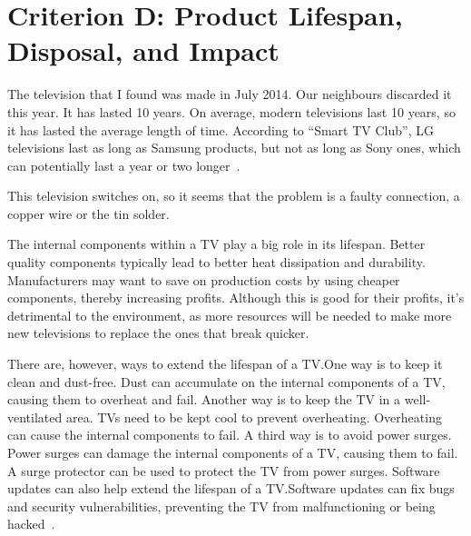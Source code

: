 \documentclass[12pt, letterpaper]{article}
\begin{document}
\section{Criterion D: Product Lifespan, Disposal, and Impact}

The television that I found was made in July 2014. Our neighbours
discarded it this year. It has lasted 10 years. On average, modern
televisions last 10 years, so it has lasted the average length of
time. According to ``Smart TV Club'', LG televisions last as long as
Samsung products, but not as long as Sony ones, which can potentially
last a year or two longer~\autocite{raj-2024}.

This television switches on, so it seems that the problem is a faulty
connection, a copper wire or the tin solder.

The internal components within a TV play a big role in its lifespan.
Better quality components typically lead to better heat dissipation
and durability. Manufacturers may want to save on production costs by
using cheaper components, thereby increasing profits. Although this
is good for their profits, it's detrimental to the environment, as
more resources will be needed to make more new televisions to replace
the ones that break quicker.

There are, however, ways to extend the lifespan of a TV.\@ One way is to
keep it clean and dust-free. Dust can accumulate on the internal
components of a TV, causing them to overheat and fail. Another way is
to keep the TV in a well-ventilated area. TVs need to be kept cool to
prevent overheating. Overheating can cause the internal components to
fail. A third way is to avoid power surges. Power surges can damage
the internal components of a TV, causing them to fail. A surge
protector can be used to protect the TV from power surges. Software
updates can also help extend the lifespan of a TV.\@ Software updates
can fix bugs and security vulnerabilities, preventing the TV from
malfunctioning or being hacked~\autocite{raj-2024}.

\printbibliography[heading=bibintoc,title=References]
\end{document}
